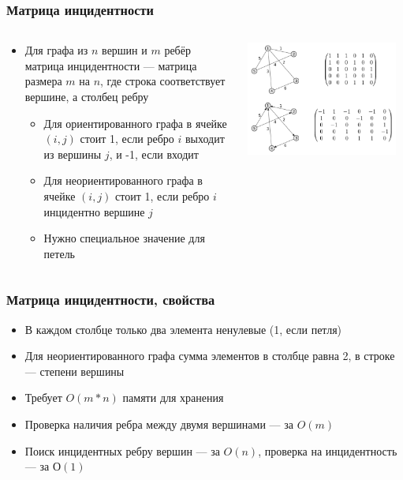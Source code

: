 \documentclass[xetex,mathserif,serif]{beamer}
\begin{document}
	\begin{frame}
		\frametitle{Матрица инцидентности}
		\begin{columns}
			\begin{column}{0.5\textwidth}
				\begin{itemize}
					\item Для графа из $n$ вершин и $m$ ребёр матрица инцидентности --- матрица размера $m$ на $n$, где строка соответствует вершине, а столбец ребру
					\begin{itemize}
						\item Для ориентированного графа в ячейке $(i, j)$ стоит 1, если ребро $i$ выходит из вершины $j$, и -1, если входит
						\item Для неориентированного графа в ячейке $(i, j)$ стоит 1, если ребро $i$ инцидентно вершине $j$
						\item Нужно специальное значение для петель
					\end{itemize}
				\end{itemize}
			\end{column}
			\begin{column}{0.5\textwidth}
				\begin{center}
					\includegraphics[width=0.95\textwidth]{incidence-matrix.png}
				\end{center}
			\end{column}
		\end{columns}
	\end{frame}

	\begin{frame}
		\frametitle{Матрица инцидентности, свойства}
		\begin{itemize}
			\item В каждом столбце только два элемента ненулевые (1, если петля)
			\item Для неориентированного графа сумма элементов в столбце равна 2, в строке --- степени вершины
			\item Требует $O(m * n)$ памяти для хранения
			\item Проверка наличия ребра между двумя вершинами --- за $O(m)$
			\item Поиск инцидентных ребру вершин --- за $O(n)$, проверка на инцидентность --- за $О(1)$
		\end{itemize}
	\end{frame}
\end{document}
